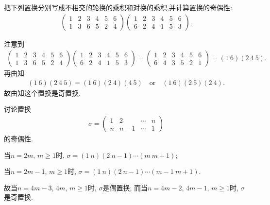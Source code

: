 \documentclass[../../main.tex]{subfiles}%
\begin{document}
\begin{example}
把下列置换分别写成不相交的轮换的乘积和对换的乘积,并计算置换的奇偶性:
\begin{align*}
\begin{pmatrix}
1&2&3&4&5&6\\
1&3&6&5&2&4
\end{pmatrix}
\begin{pmatrix}
1&2&3&4&5&6\\
6&2&4&1&5&3
\end{pmatrix}.
\end{align*}
\end{example}
\begin{solution}

注意到
\begin{align*}
\begin{pmatrix}
1&2&3&4&5&6\\
1&3&6&5&2&4
\end{pmatrix}
\begin{pmatrix}
1&2&3&4&5&6\\
6&2&4&1&5&3
\end{pmatrix}
=
\begin{pmatrix}
1&2&3&4&5&6\\
6&4&3&5&2&1
\end{pmatrix}
=
(1\ 6)(2\ 4\ 5).
\end{align*}
再由知
\begin{align*}
(1\ 6)(2\ 4\ 5)=(1\ 6)(2\ 4)(4\ 5)\quad \text{or}\quad (1\ 6)(2\ 5)(2\ 4).
\end{align*}
故由知这个置换是奇置换.

\end{solution}

\begin{example}
讨论置换
\begin{align*}
\sigma = \begin{pmatrix}
1 & 2 & \cdots & n \\
n & n-1 & \cdots & 1
\end{pmatrix}
\end{align*}
的奇偶性.
\end{example}
\begin{solution}

当$n = 2m$, $m \geqslant 1$时, $\sigma = (1\ n)(2\ n-1)\cdots(m\ m+1)$;

当$n = 2m-1$, $m \geqslant 1$时, $\sigma = (1\ n)(2\ n-1)\cdots(m-1\ m+1)$.

故当$n = 4m-3$, $4m$, $m \geqslant 1$时, $\sigma$是偶置换; 而当$n = 4m-2$, $4m-1$, $m \geqslant 1$时, $\sigma$是奇置换.

\end{solution}
\end{document}
